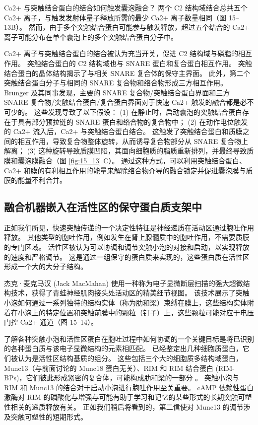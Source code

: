 Ca2+ 与突触结合蛋白的结合如何触发囊泡融合？ 
两个 C2 结构域结合总共五个 Ca2+ 离子，与触发发射体量子释放所需的最少 Ca2+ 离子数量相同（图 15–13B）。 
然而，由于多个突触结合蛋白可能参与触发释放，超过五个结合的 Ca2+ 离子可能分布在单个囊泡上的多个突触结合蛋白分子中。


Ca2+ 离子与突触结合蛋白的结合被认为充当开关，促进 C2 结构域与磷脂的相互作用。 
突触结合蛋白的 C2 结构域也与 SNARE 蛋白和复合蛋白相互作用。 
突触结合蛋白的晶体结构揭示了与相关 SNARE 复合体的保守主界面。 
此外，第二个突触结合蛋白分子与相同的 SNARE 复合物和络合物形成三方相互作用。 
Brunger 及其同事发现，主要的 SNARE 复合物/突触结合蛋白界面和三方 SNARE 复合物/突触结合蛋白/复合蛋白界面对于快速 Ca2+ 触发的融合都是必不可少的。 
这些发现导致了以下假设：
(1) 在静止时，启动囊泡的突触结合蛋白存在于具有部分预拉链的 SNARE 蛋白和络合物的复合物中； 
(2) 在动作电位触发的 Ca2+ 流入后，Ca2+ 与突触结合蛋白结合。 这触发了突触结合蛋白和质膜之间的相互作用，导致复合物整体旋转，从而诱导复合物部分从 SNARE 复合物上解离； 
(3) 这种旋转导致质膜凹陷，其面向细胞质的脂质重新排列，并最终导致质膜和囊泡膜融合（图 \ref{fig:15_13} C）。 
通过这种方式，可以利用突触结合蛋白、Ca2+ 和膜的有利相互作用的能量来解除络合物介导的融合锁定并促进囊泡膜与质膜的能量不利合并。


\subsection{融合机器嵌入在活性区的保守蛋白质支架中}

正如我们所见，快速突触传递的一个决定性特征是神经递质在活动区通过胞吐作用释放。 
其他类型的胞吐作用，例如发生在肾上腺髓质中的胞吐作用，不需要质膜的专门区域。 
活性区被认为可以协调和调节突触小泡的对接和启动，以实现释放的速度和严格调节。 
这是通过一组保守的蛋白质来实现的，这些蛋白质在活性区形成一个大的大分子结构。


杰克·麦克马汉 (Jack MacMahan) 使用一种称为电子显微断层扫描的强大超微结构技术，获得了青蛙神经肌肉接头处活动区的精美细节视图。 
该技术展示了突触小泡如何通过一系列独特的结构实体（称为肋和梁）束缚在膜上，这些结构实体附着在小泡上的特定位置和突触前膜中的颗粒（钉子）上，这些颗粒可能对应于电压门控 Ca2+ 通道（图 15–14）。


了解各种突触小泡和活性区蛋白在胞吐过程中如何协调的一个关键目标是将已识别的各种蛋白质与该电子显微结构的元素相匹配。 
已经鉴定出几种细胞质蛋白，它们被认为是活性区结构基质的组分。 
这些包括三个大的细胞质多结构域蛋白，Munc13（与前面讨论的 Munc18 蛋白无关）、RIM 和 RIM 结合蛋白 (RIM-BPs)，它们彼此形成紧密的复合体，可能构成肋和梁的一部分 。 
突触小泡与 RIM 和 Munc13 的结合对于启动小泡进行胞吐作用至关重要。 
cAMP 依赖性蛋白激酶对 RIM 的磷酸化与增强与可能有助于学习和记忆的某些形式的长期突触可塑性相关的递质释放有关。 
正如我们稍后将看到的，第二信使对 Munc13 的调节涉及突触可塑性的短期形式。


